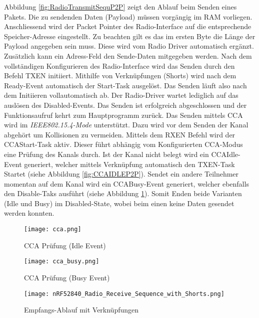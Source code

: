 Abbildung \ref{fig:RadioTransmitSequP2P} zeigt den Ablauf beim Senden eines Pakets. Die zu sendenden Daten (Payload) müssen vorgängig im RAM vorliegen. Anschliessend wird der Packet Pointer des Radio-Interface auf die entsprechende Speicher-Adresse eingestellt. Zu beachten gilt es das im ersten Byte die Länge der Payload angegeben sein muss. Diese wird vom Radio Driver automatisch ergänzt. Zusätzlich kann ein Adress-Feld den Sende-Daten mitgegeben werden. Nach dem vollständigen Konfigurieren des Radio-Interface wird das Senden durch den Befehl TXEN initiiert. Mithilfe von Verknüpfungen (Shorts) wird nach dem Ready-Event automatisch der Start-Task ausgelöst. Das Senden läuft also nach dem Initiieren vollautomatisch ab. Der Radio-Driver wartet lediglich auf das auslösen des Disabled-Events. Das Senden ist erfolgreich abgeschlossen und der Funktionsaufruf kehrt zum Hauptprogramm zurück. Das Senden mittels CCA wird im \textit{IEEE802.15.4-Mode} unterstützt. Dazu wird vor dem Senden der Kanal abgehört um Kollisionen zu vermeiden. Mittels dem RXEN Befehl wird der CCAStart-Task aktiv. Dieser führt abhängig vom Konfigurierten CCA-Modus eine Prüfung des Kanals durch. Ist der Kanal nicht belegt wird ein CCAIdle-Event generiert, welcher mittels Verknüpfung automatisch den TXEN-Task Startet (siehe Abbildung \ref{fig:CCAIDLEP2P}). Sendet ein andere Teilnehmer momentan auf dem Kanal wird ein CCABusy-Event generiert, welcher ebenfalls den Disable-Taks ausführt (siehe Abbildung \ref{fig:CCABUSYP2P}). Somit Enden beide Varianten (Idle und Busy) im Disabled-State, wobei beim einen keine Daten gesendet werden konnten. \cite{nordic_semi_nrf_infocenter_radio_transmit_sequence_2020}

\begin{figure}[!htbp]
	\begin{minipage}{0.49\textwidth}
		\centering
		\texttt{[image: cca.png]}
		\caption[Sende-Ablauf mit CCA Idle]{CCA Prüfung (Idle Event) \cite{nordic_semi_nrf_infocenter_radio_ieee_operation_2020}}
		\label{fig:CCAIDLEP2P}
	\end{minipage}
	\begin{minipage}{0.49\textwidth}
		\centering
		\texttt{[image: cca\_busy.png]}
		\caption[Sende-Ablauf mit CCA Busy]{CCA Prüfung (Busy Event) \cite{nordic_semi_nrf_infocenter_radio_ieee_operation_2020}}
		\label{fig:CCABUSYP2P}
	\end{minipage}
\end{figure}

\begin{figure} [H]
	\centering
	\texttt{[image: nRF52840\_Radio\_Receive\_Sequence\_with\_Shorts.png]}
	\caption{Empfangs-Ablauf mit Verknüpfungen \cite{nordic_semi_nrf_infocenter_radio_receive_sequence_2020}}
	\label{fig:RadioReceiveSequP2P}
\end{figure}


